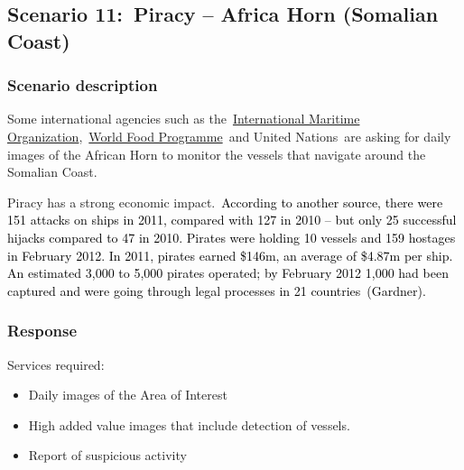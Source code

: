 \documentclass[a4paper]{article}
\newcommand\liststyleLFOix{%
\renewcommand\labelitemi{[F0B7?]}
\renewcommand\labelitemii{o}
\renewcommand\labelitemiii{[F0A7?]}
\renewcommand\labelitemiv{[F0B7?]}
}
\begin{document}
\bigskip

\clearpage
\bigskip

\subsection[Scenario 11:\ Piracy {}-- Africa Horn (Somalian
Coast)]{Scenario 11:\ \foreignlanguage{english}{Piracy -- Africa Horn
(Somalian Coast)}}
\hypertarget{Toc381777304}{}\subsubsection[Scenario
description]{Scenario description}
\hypertarget{Toc381777305}{}\foreignlanguage{english}{Some international
agencies such as
the}\foreignlanguage{english}{~}\href{http://en.wikipedia.org/wiki/International_Maritime_Organization}{\foreignlanguage{english}{International
Maritime
Organization}}\foreignlanguage{english}{,\ }\href{http://en.wikipedia.org/wiki/World_Food_Programme}{\foreignlanguage{english}{World
Food Programme}}\ and United Nations\foreignlanguage{english}{\ are
asking for daily images of the African Horn to monitor the vessels that
navigate around the Somalian Coast.\ }


\bigskip

\foreignlanguage{english}{Piracy has a strong economic
impact.\ }\textcolor{black}{According to another source, there were 151
attacks on ships in 2011, compared with 127 in 2010 -- but only 25
successful hijacks compared to 47 in 2010. Pirates were holding 10
vessels and 159 hostages in February 2012. In 2011, pirates earned
\$146m, an average of \$4.87m per ship. An estimated 3,000 to 5,000
pirates operated; by February 2012 1,000 had been captured and were
going through legal processes in 21
countries\ }\textcolor{black}{(Gardner)}\textcolor{black}{.}


\bigskip

\subsubsection[Response]{ Response}
\hypertarget{Toc381777306}{}{
Services required:}

\liststyleLFOix
\begin{itemize}
\item {
Daily images of the Area of Interest}
\item {
High added value images that include detection of vessels.}
\item {
Report of suspicious activity}
\end{itemize}
\end{document}

